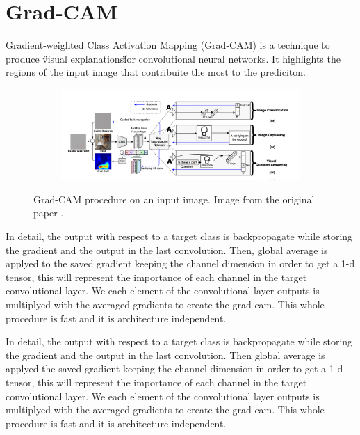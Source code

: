 \documentclass[../document.tex]{subfiles}
\begin{document}
\section{Grad-CAM}
Gradient-weighted Class Activation Mapping (Grad-CAM) \cite{gradcam} is a technique to produce \"visual explanations\" for convolutional neural networks. It highlights the regions of the input image that contribuite the most to the prediciton. 
\begin{figure}[H]
    \centering
    \begin{subfigure}[b]{1\textwidth}
        \includegraphics[width=\linewidth]{../img/5/grad_cam1.png}
    \end{subfigure}
\caption{Grad-CAM procedure on an input image. Image from the original paper \cite{gradcam}.}
\end{figure}
In detail, the output with respect to a target class is backpropagate while storing the gradient and the output in the last convolution. Then, global average is applyed to the saved gradient keeping the channel dimension in order to get a 1-d tensor, this will represent the importance of each channel in the target convolutional layer. We  each element of the convolutional layer outputs is multiplyed with the averaged gradients to create the grad cam. This whole procedure is fast and it is architecture independent.

In detail, the output with respect to a target class is backpropagate while storing the gradient and the output in the last convolution. Then global average is applyed the saved gradient keeping the channel dimension in order to get a 1-d tensor, this will represent the importance of each channel in the target convolutional layer. We  each element of the convolutional layer outputs is multiplyed with the averaged gradients to create the grad cam. This whole procedure is fast and it is architecture independent.
% 

%
\end{document}
